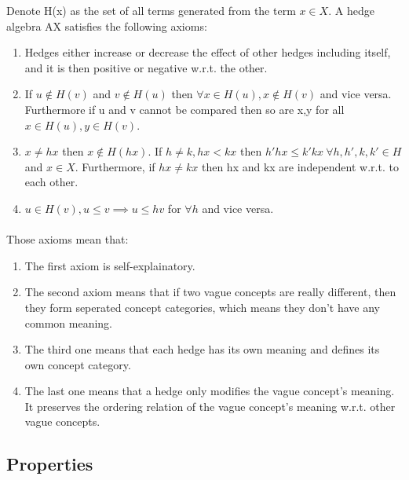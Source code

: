 \documentclass[part1.tex]{subfiles}
\begin{document}
Denote H(x) as the set of all terms generated from the term $x
\in X$. A hedge algebra AX satisfies the following  axioms:
\begin{enumerate}

        \item Hedges either increase or decrease the effect of other hedges including itself, and it is 
then positive or negative w.r.t. the other.

        \item If \(u\notin H(v)\) and \(v\notin H(u)\) then \(\forall x\in H(u), x\notin H(v)\) and vice versa. 
	Furthermore if u and v cannot be compared then so are x,y for all \(x\in H(u), y\in H(v)\).


\item $x \not = hx$ then  $x \notin
        H(hx)$. If $h\neq k, hx<kx$ then $h'hx\le k'kx\: \forall h,h',k,k'\in
	H$ and $x \in X$.  Furthermore, if \(hx \neq kx\) then hx and kx are independent w.r.t. to each other.


\item \(u \in H(v), u \le v\implies u\le hv\) for \(\forall h\) and vice versa.
\end{enumerate}
\paragraph{} Those axioms mean that:
\begin{enumerate}
        \item The first axiom is self-explainatory.
        \item The second axiom means that if two vague concepts are really different, then they form seperated concept categories, which means they don't have any common meaning.
        \item The third one means that each hedge has its own meaning and defines its own concept category.
        \item The last one means that a hedge only modifies the vague concept's meaning. It preserves the ordering relation of the vague concept's meaning w.r.t. other vague concepts.
\end{enumerate}
\subsection{Properties}
\end{document}
